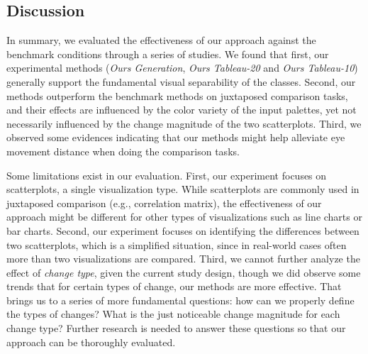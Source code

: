 
\vspace{.3em}
\subsection{Discussion}

In summary, we evaluated the effectiveness of our approach against the benchmark conditions through a series of studies. We found that first, our experimental methods (\emph{Ours Generation}, \emph{Ours Tableau-20} and \emph{Ours Tableau-10}) generally support the fundamental visual separability of the classes. Second, our methods outperform the benchmark methods on juxtaposed comparison tasks, and their effects are influenced by the color variety of the input palettes, yet not necessarily influenced by the change magnitude of the two scatterplots. Third, we observed some evidences indicating that our methods might help alleviate eye movement distance when doing the comparison tasks.


Some limitations exist in our evaluation.
First, our experiment focuses on scatterplots, a single visualization type. While scatterplots are commonly used in juxtaposed comparison (e.g., correlation matrix), the effectiveness of our approach might be different for other types of visualizations such as line charts or bar charts.
Second, our experiment focuses on identifying the differences between two scatterplots, which is a simplified situation, since in real-world cases often more than two visualizations are compared.
Third, we cannot further analyze the effect of \emph{change type}, given the current study design, though we did observe some trends that for certain types of change, our methods are more effective.
That brings us to a series of more fundamental questions: how can we properly define the types of changes? What is the just noticeable change magnitude for each change type?
Further research is needed to answer these questions so that our approach can be thoroughly evaluated.






